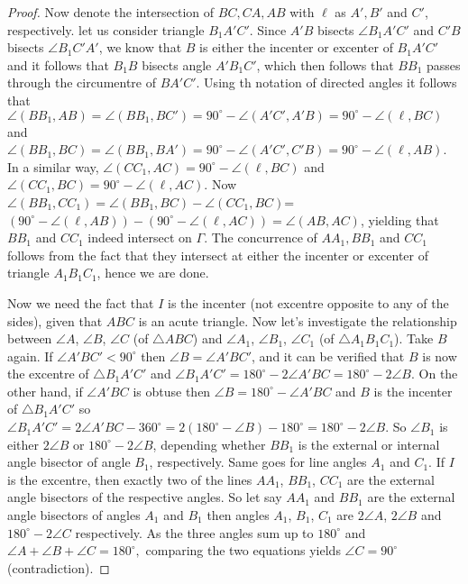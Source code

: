 \documentclass[11pt,a4paper]{article}
\begin{document}
\begin{enumerate}
	\begin{proof}
		Now denote the intersection of $BC, CA, AB$ with $\ell$ as $A',B'$ and $C'$, respectively. let us consider triangle $B_1A'C'$. Since $A'B$ bisects $\angle B_1A'C'$ and $C'B$ bisects $\angle B_1C'A'$, we know that $B$ is either the incenter or excenter of $B_1A'C'$ and it follows that $B_1B$ bisects angle $A'B_1C'$, which then follows that $BB_1$ passes through the circumentre of $BA'C'$. Using th notation of directed angles it follows that $\angle (BB_1,AB)=\angle (BB_1,BC')=90^{\circ}-\angle (A'C',A'B)=90^{\circ}-\angle (\ell, BC)$ and $\angle (BB_1,BC)=\angle (BB_1,BA')=90^{\circ}-\angle (A'C',C'B)=90^{\circ}-\angle (\ell,AB)$. In a similar way, $\angle (CC_1,AC)=90^{\circ}-\angle (\ell, BC)$ and $\angle (CC_1,BC)=90^{\circ}-\angle (\ell, AC).$ Now $\angle (BB_1,CC_1)=\angle (BB_1, BC)-\angle (CC_1, BC)$=$(90^{\circ}-\angle (\ell,AB))-(90^{\circ}-\angle (\ell,AC))=\angle (AB, AC)$, yielding that $BB_1$ and $CC_1$ indeed intersect on $\Gamma$. The concurrence of $AA_1, BB_1$ and $CC_1$ follows from the fact that they intersect at either the incenter or excenter of triangle $A_1B_1C_1$, hence we are done.
		
		Now we need the fact that $I$ is the incenter (not excentre opposite to any of the sides), given that $ABC$ is an acute triangle. Now let's investigate the relationship between $\angle A$, $\angle B$, $\angle C$ (of $\triangle ABC$) and $\angle A_1$, $\angle B_1$, $\angle C_1$ (of $\triangle A_1B_1C_1$). Take $B$ again. If $\angle A'BC'<90^{\circ}$ then $\angle B=\angle A'BC'$, and it can be verified that $B$ is now the excentre of $\triangle B_1A'C'$ and $\angle B_1A'C'=180^{\circ}-2\angle A'BC=180^{\circ}-2\angle B$. On the other hand, if $\angle A'BC$ is obtuse then $\angle B=180^{\circ}-\angle A'BC$ and $B$ is the incenter of $\triangle B_1A'C'$ so $\angle B_1A'C'=2\angle A'BC-360^{\circ}=2(180^{\circ}-\angle B)-180^{\circ}=180^{\circ}-2\angle B.$ So $\angle B_1$ is either $2\angle B$ or $180^{\circ}-2\angle B$, depending whether $BB_1$ is the external or internal angle bisector of angle $B_1$, respectively. Same goes for line angles $A_1$ and $C_1$. If $I$ is the excentre, then exactly two of the lines $AA_1$, $BB_1$, $CC_1$ are the external angle bisectors of the respective angles. So let say $AA_1$ and $BB_1$ are the external angle bisectors of angles $A_1$ and $B_1$ then angles $A_1$, $B_1$, $C_1$ are $2\angle A$, $2\angle B$ and $180^{\circ}-2\angle C$ respectively. As the three angles sum up to $180^{\circ}$ and $\angle A+\angle B+\angle C=180^{\circ},$ comparing the two equations yields $\angle C=90^{\circ}$ (contradiction).
	\end{proof}
	

\end{enumerate}
\end{document}
